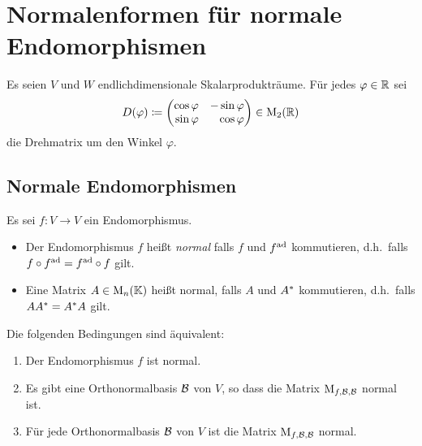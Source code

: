 \chapter{Normalenformen für normale Endomorphismen}

Es seien $V$ und $W$ endlichdimensionale Skalarprodukträume.
Für jedes $\varphi \in \mathbb{R}$ sei
\[
            D(\varphi)
  \coloneqq \begin{pmatrix*}[r]
              \cos \varphi  & -\sin \varphi \\
              \sin \varphi  &  \cos \varphi
            \end{pmatrix*}
  \in       \matrices{2}{\Real}
\]
die Drehmatrix um den Winkel $\varphi$.





\section{Normale Endomorphismen}

Es sei $f \colon V \to V$ ein Endomorphismus.

\begin{definition}
  \leavevmode
  \begin{itemize}
    \item
      Der Endomorphismus $f$ heißt \emph{normal} falls $f$ und $f^{\operatorname{ad}}$ kommutieren, d.h.\ falls $f \circ f^{\operatorname{ad}} = f^{\operatorname{ad}} \circ f$ gilt.
    \item
      Eine Matrix $A \in \operatorname{M}_{n}(\mathbb{K})$ heißt normal, falls $A$ und $A^*$ kommutieren, d.h.\ falls $A A^* = A^* A$ gilt.
  \end{itemize}
\end{definition}

\begin{lemma}
  Die folgenden Bedingungen sind äquivalent:
  \begin{enumerate}
    \item
      Der Endomorphismus $f$ ist normal.
    \item
      Es gibt eine Orthonormalbasis $\mathcal{B}$ von $V$, so dass die Matrix $\operatorname{M}_{f, \mathcal{B}, \mathcal{B}}$ normal ist.
    \item
      Für jede Orthonormalbasis $\mathcal{B}$ von $V$ ist die Matrix $\operatorname{M}_{f, \mathcal{B}, \mathcal{B}}$ normal.
  \end{enumerate}
\end{lemma}



